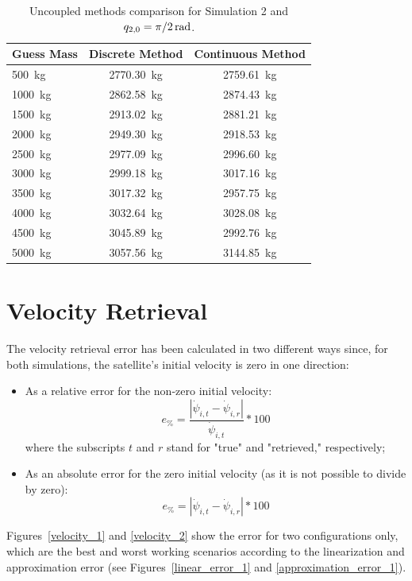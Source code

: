 \documentclass[a4paper,12pt,oneside]{report}
\begin{document}
\begin{table}[b]
  \caption{Uncoupled methods comparison for Simulation 2 and $q_{2,0}=\SI[parse-numbers = false]{\pi/2}{\radian}$.}
  \label{uncoupled_comparison_2}
  \begin{center}
  \begin{tabular}{lcc}
    \toprule
    \textbf{Guess Mass}&\textbf{Discrete Method}&\textbf{Continuous Method}\\
  \midrule
  \SI{500}{\kilogram}&\SI{2770.30}{\kilogram}&\SI{2759.61}{\kilogram}\\
  \SI{1000}{\kilogram}&\SI{2862.58}{\kilogram}&\SI{2874.43}{\kilogram}\\
  \SI{1500}{\kilogram}&\SI{2913.02}{\kilogram}&\SI{2881.21}{\kilogram}\\
  \SI{2000}{\kilogram}&\SI{2949.30}{\kilogram}&\SI{2918.53}{\kilogram}\\
  \SI{2500}{\kilogram}&\SI{2977.09}{\kilogram}&\SI{2996.60}{\kilogram}\\
  \SI{3000}{\kilogram}&\SI{2999.18}{\kilogram}&\SI{3017.16}{\kilogram}\\
  \SI{3500}{\kilogram}&\SI{3017.32}{\kilogram}&\SI{2957.75}{\kilogram}\\
  \SI{4000}{\kilogram}&\SI{3032.64}{\kilogram}&\SI{3028.08}{\kilogram}\\
  \SI{4500}{\kilogram}&\SI{3045.89}{\kilogram}&\SI{2992.76}{\kilogram}\\
  \SI{5000}{\kilogram}&\SI{3057.56}{\kilogram}&\SI{3144.85}{\kilogram}\\
  \bottomrule
  \end{tabular}
  \end{center}
\end{table}
\newpage
\section{Velocity Retrieval}
The velocity retrieval error has been calculated in two different ways since, for both simulations, the satellite's initial velocity is zero in one direction:
\begin{itemize}
  \item As a relative error for the non-zero initial velocity: \begin{equation}
    e_{\%}=\frac{|\dot{\psi}_{i,t}-\dot{\psi}_{i,r}|}{\dot{\psi}_{i,t}}*100
  \end{equation}
  where the subscripts $t$ and $r$ stand for "true" and "retrieved," respectively;
  \item As an absolute error for the zero initial velocity (as it is not possible to divide by zero):\begin{equation}
    e_{\%}=|\dot{\psi}_{i,t}-\dot{\psi}_{i,r}|*100
  \end{equation}
\end{itemize}
Figures~\ref{velocity_1} and \ref{velocity_2} show the error for two configurations only, which are the best and worst working scenarios according to the linearization and approximation error (see Figures~\ref{linear_error_1} and \ref{approximation_error_1}).\\
\end{document}
